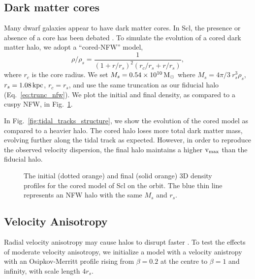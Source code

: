\subsection{Dark matter cores}\label{dark-matter-cores}

Many dwarf galaxies appear to have dark matter cores. In Scl, the
presence or absence of a core has been debated
\citep[e.g.,][]{battaglia+2008, walker+2009a, agnello+evans2012, breddels+helmi2013, amorisco+zavala+deboer2014, richardson+fairbairn2014}.
To simulate the evolution of a cored dark matter halo, we adopt a
``cored-NFW'' model, \begin{equation}{
\rho/\rho   _s = \frac{1}{(1+r/r_s)^2 (r_c/r_s + r/r_s)},
}\end{equation} where \(r_c\) is the core radius. We set
\(M_s=0.54\times10^{10}\,{\rm M}_{\odot}\) where \(M_s = 4\pi/3\ r_s^3 \rho_s\),
\(r_s=1.08\,{\rm kpc}\), \(r_c=r_s\), and use the same truncation as our
fiducial halo (Eq.~\ref{eq:trunc_nfw}). We plot the initial and final
density, as compared to a cuspy NFW, in Fig.~\ref{fig:cored_i_f}.

In Fig.~\ref{fig:tidal_tracks_structure}, we show the evolution of the
cored model as compared to a heavier halo. The cored halo loses more
total dark matter mass, evolving further along the tidal track as
expected. However, in order to reproduce the observed velocity
dispersion, the final halo maintains a higher \({\rm v}_{\rm max}\) than the
fiducial halo.

\begin{figure}
\centering
{}
\caption[Cored initial and final density profile]{The initial (dotted
orange) and final (solid orange) 3D density profiles for the cored model
of Scl on the \smallperi{} orbit. The blue thin line represents an NFW
halo with the same \(M_s\) and \(r_s\).}\label{fig:cored_i_f}
\end{figure}

\subsection{Velocity Anisotropy}\label{velocity-anisotropy}

Radial velocity anisotropy may cause halos to disrupt faster
\citep[e.g.][]{chiang+bosch+schive2024}. To test the effects of moderate
velocity anisotropy, we initialize a model with a velocity anistropy
with an Osipkov-Merritt profile rising from \(\beta=0.2\) at the centre
to \(\beta=1\) and infinity, with scale length \(4r_s\).

